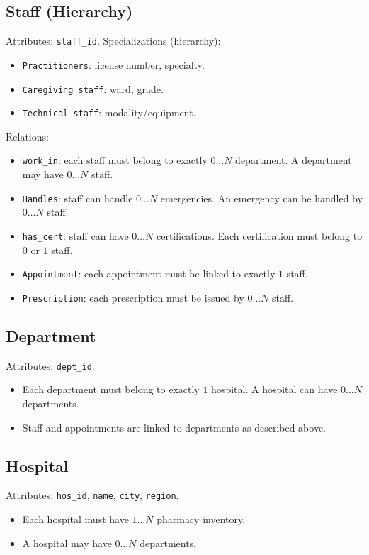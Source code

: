 \documentclass[a4paper,12pt]{article}
\begin{document}
\subsection*{Staff (Hierarchy)}
Attributes: \texttt{staff\_id}.  
Specializations (hierarchy):
\begin{itemize}
    \item \texttt{Practitioners}: license number, specialty.
    \item \texttt{Caregiving staff}: ward, grade.
    \item \texttt{Technical staff}: modality/equipment.
\end{itemize}

Relations:
\begin{itemize}
    \item \texttt{work\_in}: each staff must belong to exactly $0\dots N$ department. A department may have $0\dots N$ staff.
    \item \texttt{Handles}: staff can handle $0\dots N$ emergencies. An emergency can be handled by $0\dots N$ staff.
    \item \texttt{has\_cert}: staff can have $0\dots N$ certifications. Each certification must belong to $0$ or $1$ staff.
    \item \texttt{Appointment}: each appointment must be linked to exactly $1$ staff.
    \item \texttt{Prescription}: each prescription must be issued by $0\dots N$ staff.
\end{itemize}

\subsection*{Department}
Attributes: \texttt{dept\_id}.  
\begin{itemize}
    \item Each department must belong to exactly $1$ hospital. A hospital can have $0\dots N$ departments.
    \item Staff and appointments are linked to departments as described above.
\end{itemize}

\subsection*{Hospital}
Attributes: \texttt{hos\_id}, \texttt{name}, \texttt{city}, \texttt{region}.  
\begin{itemize}
    \item Each hospital must have $1\dots N$ pharmacy inventory.
    \item A hospital may have $0\dots N$ departments.
\end{itemize}
\end{document}

